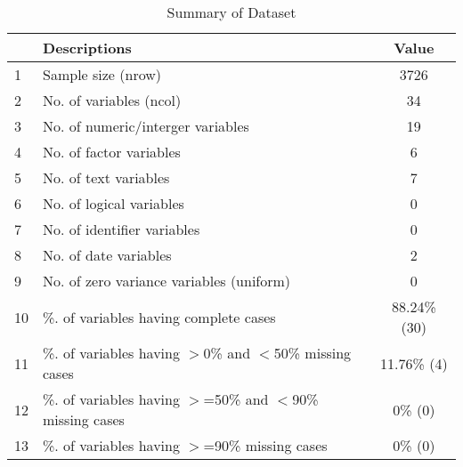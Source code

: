 \begin{table}[ht]
\centering
\caption{Summary of Dataset} 
\begin{tabular}{llc}
  \hline
 & Descriptions & Value \\ 
  \hline
1 & Sample size (nrow) & 3726 \\ 
  2 & No. of variables (ncol) & 34 \\ 
  3 & No. of numeric/interger variables & 19 \\ 
  4 & No. of factor variables & 6 \\ 
  5 & No. of text variables & 7 \\ 
  6 & No. of logical variables & 0 \\ 
  7 & No. of identifier variables & 0 \\ 
  8 & No. of date variables & 2 \\ 
  9 & No. of zero variance variables (uniform) & 0 \\ 
  10 & \%. of variables having complete cases & 88.24\% (30) \\ 
  11 & \%. of variables having $>$0\% and $<$50\% missing cases & 11.76\% (4) \\ 
  12 & \%. of variables having $>$=50\% and $<$90\% missing cases & 0\% (0) \\ 
  13 & \%. of variables having $>$=90\% missing cases & 0\% (0) \\ 
   \hline
\end{tabular}
\end{table}
